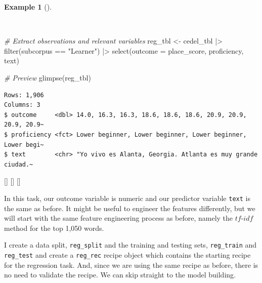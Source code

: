 \documentclass[
  letterpaper,
  krantz1]{latex/krantz-mod}
\newenvironment{Shaded}{\begin{snugshade}}{\end{snugshade}}
\newcommand{\AttributeTok}[1]{\textcolor[rgb]{0.00,0.00,0.00}{#1}}
\newcommand{\CommentTok}[1]{\textcolor[rgb]{0.00,0.00,0.00}{\textit{#1}}}
\newcommand{\FunctionTok}[1]{\textcolor[rgb]{0.00,0.00,0.00}{#1}}
\newcommand{\NormalTok}[1]{\textcolor[rgb]{0.00,0.00,0.00}{#1}}
\newcommand{\OtherTok}[1]{\textcolor[rgb]{0.00,0.00,0.00}{#1}}
\newcommand{\SpecialCharTok}[1]{\textcolor[rgb]{0.00,0.00,0.00}{#1}}
\newcommand{\StringTok}[1]{\textcolor[rgb]{0.00,0.00,0.00}{#1}}
\newcommand{\cindex}[1]{%
  \StrSubstitute{#1}{_}{\_}[\temp]%
  \index{\temp}%
}
\theoremstyle{definition}
\theoremstyle{definition}
\newtheorem{example}{Example}[chapter]
\theoremstyle{remark}
\begin{document}
\begin{example}[]\protect\hypertarget{exm-predict-reg-data}{}\label{exm-predict-reg-data}

~

\begin{Shaded}
\begin{Highlighting}[numbers=left,,]
\CommentTok{\# Extract observations and relevant variables}
\NormalTok{reg\_tbl }\OtherTok{\textless{}{-}}
\NormalTok{  cedel\_tbl }\SpecialCharTok{|\textgreater{}}
  \FunctionTok{filter}\NormalTok{(subcorpus }\SpecialCharTok{==} \StringTok{"Learner"}\NormalTok{) }\SpecialCharTok{|\textgreater{}}
  \FunctionTok{select}\NormalTok{(}\AttributeTok{outcome =}\NormalTok{ place\_score, proficiency, text)}

\CommentTok{\# Preview}
\FunctionTok{glimpse}\NormalTok{(reg\_tbl)}
\end{Highlighting}
\end{Shaded}

\begin{verbatim}
Rows: 1,906
Columns: 3
$ outcome     <dbl> 14.0, 16.3, 16.3, 18.6, 18.6, 18.6, 20.9, 20.9, 20.9, 20.9~
$ proficiency <fct> Lower beginner, Lower beginner, Lower beginner, Lower begi~
$ text        <chr> "Yo vivo es Alanta, Georgia. Atlanta es muy grande ciudad.~
\end{verbatim}

\cindex{filter()}\cindex{select()}\cindex{glimpse()}

\end{example}

In this task, our outcome variable is numeric
and our predictor variable \texttt{text} is the same as
before. It might be useful to engineer the
features differently, but we will start with the same feature
engineering process as before, namely the \(tf\)-\(idf\) method for the
top 1,050 words.

I create a data split, \texttt{reg\_split} and the training and testing
sets, \texttt{reg\_train} and \texttt{reg\_test} and create a
\texttt{reg\_rec} recipe object which contains the starting recipe for
the regression task. And, since we are using the same recipe as before,
there is no need to validate the recipe. We can skip straight to the
model building.
\end{document}
